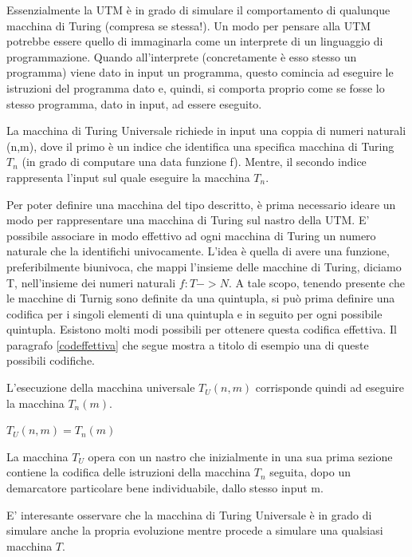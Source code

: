 Essenzialmente la UTM \`e in grado di simulare il comportamento di
qualunque macchina di Turing (compresa se stessa!). Un modo per
pensare alla UTM potrebbe essere quello di immaginarla come un
interprete di un linguaggio di programmazione. Quando all'interprete
(concretamente \`e esso stesso un programma) viene dato in input un
programma, questo comincia ad eseguire le istruzioni del programma
dato e, quindi, si comporta proprio come se fosse lo stesso programma,
dato in input, ad essere eseguito.

La macchina di Turing Universale richiede in input una coppia di
numeri naturali (n,m), dove il primo \`e un indice che identifica una
specifica macchina di Turing $T_n$ (in grado di computare una data
funzione f). Mentre, il secondo indice rappresenta l'input sul quale
eseguire la macchina $T_n$.

Per poter definire una macchina del tipo descritto, \`e prima
necessario ideare un modo per rappresentare una macchina di Turing sul
nastro della UTM. E' possibile associare in modo effettivo ad ogni
macchina di Turing un numero naturale che la identifichi
univocamente. L'idea \`e quella di avere una funzione, preferibilmente
biunivoca, che mappi l'insieme delle macchine di Turing, diciamo T,
nell'insieme dei numeri naturali $f:T->N$. A tale scopo, tenendo
presente che le macchine di Turnig sono definite da una quintupla, si
pu\`o prima definire una codifica per i singoli elementi di una
quintupla e in seguito per ogni possibile quintupla. Esistono molti
modi possibili per ottenere questa codifica effettiva. Il paragrafo
\ref{codeffettiva} che segue mostra a titolo di esempio una di queste
possibili codifiche.

L'esecuzione della macchina universale $T_U(n,m)$ corrisponde quindi
ad eseguire la macchina $T_n(m)$.

\begin{center}
$T_U(n,m) = T_n(m)$
\end{center}

\vspace{10pt}

La macchina $T_U$ opera con un nastro che inizialmente in una sua
prima sezione contiene la codifica delle istruzioni della macchina
$T_n$ seguita, dopo un demarcatore particolare bene individuabile,
dallo stesso input m.

E' interesante osservare che la macchina di Turing Universale \`e in
grado di simulare anche la propria evoluzione mentre procede a
simulare una qualsiasi macchina $T$.

